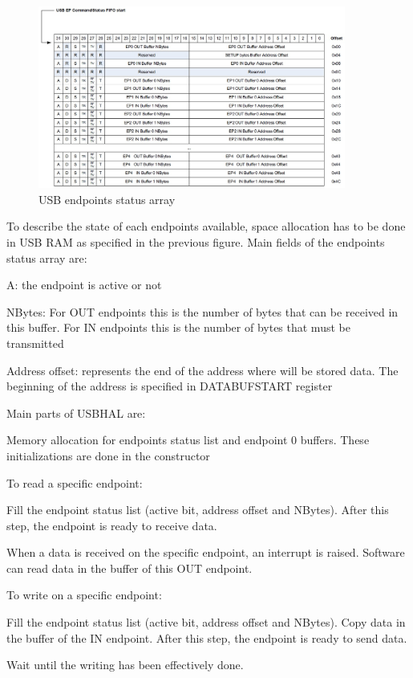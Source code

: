 \documentclass[pdftex,10pt,a4paper]{report}
\newenvironment{packed_item}{
\begin{itemize}
  \setlength{\itemsep}{1pt}
  \setlength{\parskip}{0pt}
  \setlength{\parsep}{0pt}
}{\end{itemize}}
\begin{document}
\begin{figure}[h!]
		\centering
		\includegraphics[width=0.9\textwidth]{./usb_endpoints.jpg}
		\caption{USB endpoints status array}
		\label{USB endpoints status array}
\end{figure}

To describe the state of each endpoints available, space allocation has to be done in USB RAM as specified in the previous figure. Main fields of the endpoints status array are:
\begin{packed_item}
	\item A: the endpoint is active or not
	\item NBytes: For OUT endpoints this is the number of bytes that can be received in this buffer. For IN endpoints this is the number of bytes that must be transmitted
	\item Address offset: represents the end of the address where will be stored data. The beginning of the address is specified in DATABUFSTART register 
\end{packed_item}


Main parts of USBHAL are:

\begin{packed_item}
	\item Memory allocation for endpoints status list and endpoint 0 buffers. These initializations are done in the constructor
	\item To read a specific endpoint:
		\begin{packed_item}
			\item Fill the endpoint status list (active bit, address offset and NBytes). After this step, the endpoint is ready to receive data.
			\item When a data is received on the specific endpoint, an interrupt is raised. Software can read data in the buffer of this OUT endpoint.
		\end{packed_item}
	\item To write on a specific endpoint:
		\begin{packed_item}
			\item Fill the endpoint status list (active bit, address offset and NBytes). Copy data in the buffer of the IN endpoint. After this step, the endpoint is ready to send data.
			\item Wait until the writing has been effectively done.
		\end{packed_item}
\end{packed_item}
\end{document}
